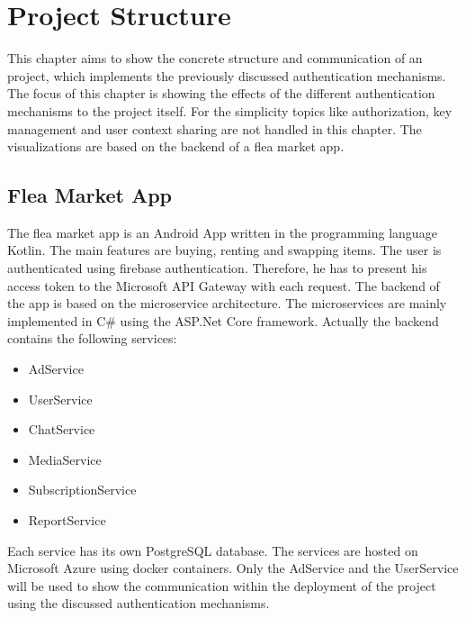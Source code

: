\chapter{Project Structure}
\label{cha:project_structure}
This chapter aims to show the concrete structure and communication of an project, which implements the previously discussed authentication mechanisms.
The focus of this chapter is showing the effects of the different authentication mechanisms to the project itself.
For the simplicity topics like authorization, key management and user context sharing are not handled in this chapter.
The visualizations are based on the backend of a flea market app.

\section{Flea Market App}
The flea market app is an Android App written in the programming language Kotlin.
The main features are buying, renting and swapping items.
The user is authenticated using firebase authentication.
Therefore, he has to present his access token to the Microsoft API Gateway with each request.
The backend of the app is based on the microservice architecture.
The microservices are mainly implemented in C\# using the ASP.Net Core framework.
Actually the backend contains the following services:
\begin{itemize}
	\item AdService
	\item UserService
	\item ChatService
	\item MediaService
	\item SubscriptionService
	\item ReportService
\end{itemize}
Each service has its own PostgreSQL database.
The services are hosted on Microsoft Azure using docker containers.
Only the AdService and the UserService will be used to show the communication within the deployment of the project using the discussed authentication mechanisms.

